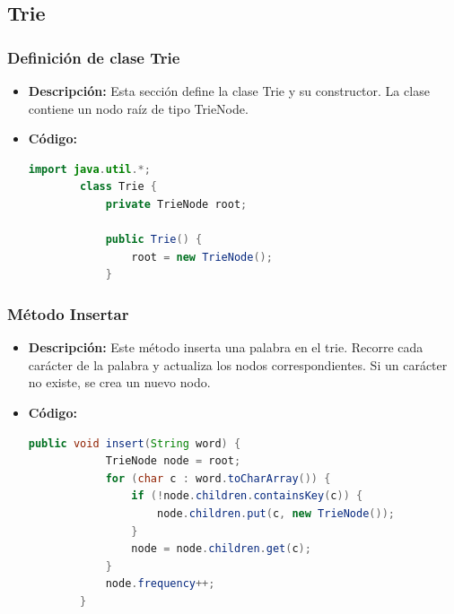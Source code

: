 \documentclass{article}
\begin{document}

  \subsection{Trie}
  
  
  \subsubsection{Definición de clase Trie}
  \begin{itemize}
    \item \textbf{Descripción: }Esta sección define la clase Trie y su constructor. La clase contiene un nodo raíz de tipo TrieNode.
    \item \textbf{Código: }
    \begin{lstlisting}[language=Java, caption={Clase Trie}]
        import java.util.*;
        class Trie {
            private TrieNode root;

            public Trie() {
                root = new TrieNode();
            }
    \end{lstlisting}
  \end{itemize}
    
  
  \subsubsection{Método Insertar}
  \begin{itemize}
    \item \textbf{Descripción: }Este método inserta una palabra en el trie. Recorre cada carácter de la palabra y actualiza los nodos correspondientes. Si un carácter no existe, 
    se crea un nuevo nodo.
    \item \textbf{Código: } 
    \begin{lstlisting}[language=Java, caption={Método Insertar}]
        public void insert(String word) {
            TrieNode node = root;
            for (char c : word.toCharArray()) {
                if (!node.children.containsKey(c)) {
                    node.children.put(c, new TrieNode());
                }
                node = node.children.get(c);
            }
            node.frequency++;
        }
    \end{lstlisting}
  \end{itemize}
    
  
\end{document}
